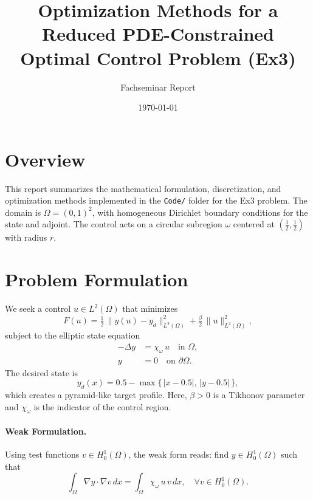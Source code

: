 \documentclass[11pt,a4paper]{article}
\title{Optimization Methods for a Reduced PDE-Constrained Optimal Control Problem (Ex3)}
\author{Fachseminar Report}
\date{\today}
\begin{document}
\maketitle

\section*{Overview}
This report summarizes the mathematical formulation, discretization, and optimization methods implemented in the \texttt{Code/} folder for the Ex3 problem. The domain is $\Omega=(0,1)^2$, with homogeneous Dirichlet boundary conditions for the state and adjoint. The control acts on a circular subregion $\omega$ centered at $(\tfrac{1}{2},\tfrac{1}{2})$ with radius $r$.

\section{Problem Formulation}
We seek a control $u\in L^2(\Omega)$ that minimizes
\begin{equation}
  F(u) = \tfrac{1}{2}\,\|y(u) - y_d\|_{L^2(\Omega)}^2 + \tfrac{\beta}{2}\,\|u\|_{L^2(\Omega)}^2,
\end{equation}
subject to the elliptic state equation
\begin{align}
  -\Delta y &= \chi_{\omega}\,u \quad \text{in } \Omega, \\
  y &= 0 \quad \text{on } \partial\Omega.
\end{align}
The desired state is
\begin{equation}
 y_d(x) = 0.5 - \max\{\,|x-0.5|,\,|y-0.5|\,\},
\end{equation}
which creates a pyramid-like target profile. Here, $\beta>0$ is a Tikhonov parameter and $\chi_{\omega}$ is the indicator of the control region.

\paragraph{Weak Formulation.} Using test functions $v\in H_0^1(\Omega)$, the weak form reads: find $y\in H_0^1(\Omega)$ such that
\begin{equation}
  \int_{\Omega} \nabla y\cdot\nabla v\,dx = \int_{\Omega} \chi_{\omega}\,u\,v\,dx,\quad \forall v\in H_0^1(\Omega).
\end{equation}
\end{document}

